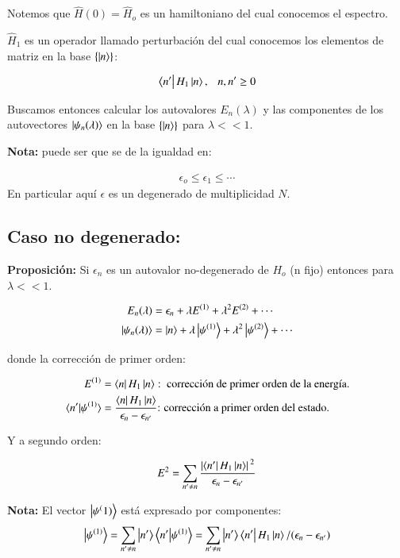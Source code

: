 Notemos que $\hat{H}(0)=\hat{H}_o$ es un hamiltoniano del cual conocemos el espectro.



$\hat{H}_1$ es un operador llamado perturbación del cual conocemos los elementos de matriz en la base $\{\ket{n}\}$:

\begin{align*}
    \bra{n'}H_1\ket{n}, ~~~ n,n'\geq 0
\end{align*}

Buscamos entonces calcular los autovalores $E_n(\lambda)$ y las componentes de los autovectores $\ket{\psi_n(\lambda)}$ en la base $\{\ket{n}\} $ para $\lambda<<1$.

\textbf{Nota:} puede ser que se de la igualdad en:

\begin{align*}
    \epsilon_o\leq\epsilon_1\leq\cdots
\end{align*}
En particular aquí $\epsilon$ es un degenerado de multiplicidad $N$.

\subsection{Caso no degenerado:}
\textbf{Proposición:} Si $\epsilon_n$ es un autovalor no-degenerado de $H_o$ (n fijo) entonces para $\lambda<<1$.

\begin{align*}
    E_n(\lambda)&=\epsilon_n+\lambda E^{(1)}+\lambda^2E^{(2)}+\cdots\\
    \ket{\psi_n(\lambda)}&= \ket{n}+\lambda\ket{\psi^{(1)}}+\lambda^2\ket{\psi^{(2)}}+\cdots
\end{align*}

donde la corrección de primer orden:

\begin{align*}
    E^{(1)}&=\bra{n}H_1\ket{n}:\text{ corrección de primer orden de la energía.}\\
    \bra{n'}\ket*{\psi^{(1)}}&=\frac{\bra{n}H_1\ket{n}}{\epsilon_n-\epsilon_{n'}}\text{: corrección a primer orden del estado.}
\end{align*}

Y a segundo orden:

\begin{align*}
    E^2=\sum_{n'\neq n}\frac{\abs*{\bra{n'}H_1\ket{n}}^2}{\epsilon_n-\epsilon_{n'}}
\end{align*}

\textbf{Nota:} El vector $\ket{\psi^(1)}$ está expresado por componentes:
\begin{align*}
    \ket{\psi^{(1)}}=\sum_{n'\neq n}\ket{n'}\bra{n'}\ket{\psi^{(1)}}=\sum_{n'\neq n}\ket{n'}\bra{n'}H_1\ket{n}/(\epsilon_n-\epsilon_{n'})
\end{align*}

